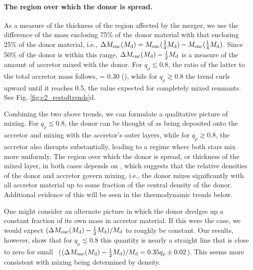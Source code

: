 \paragraph{The region over which the donor is spread.} As a measure of the thickness of the region affected by the merger, we use the difference of the mass enclosing 75\% of the donor material with that enclosing 25\% of the donor material, i.e., $\MMthick = M_{\rm enc}(\frac{3}{4}\Md) - M_{\rm enc}(\frac{1}{4}\Md)$.  Since 50\% of the donor is within this range, $\MMthick - \frac{1}{2}\Md$ is a measure of the amount of accretor mixed with the donor.  For $q_\rho\lesssim0.8$, the ratio of the latter to the total accretor mass follows,
\eqbegin
{} = 0.30\qrho
\qquad(),
\eqend
while for $q_\rho\gtrsim0.8$ the trend curls upward until it reaches 0.5, the value expected for completely mixed remnants.  See Fig. \ref{fig:c2_restoftrends}d.

Combining the two above trends, we can formulate a qualitative picture of mixing.  For $q_\rho\lesssim0.8$, the donor can be thought of as being deposited onto the accretor and mixing with the accretor's outer layers, while for $q_\rho\gtrsim0.8$, the accretor also disrupts substantially, leading to a regime where both stars mix more uniformly.  The region over which the donor is spread, or thickness of the mixed layer, in both cases depends on {\qrho}, which suggests that the relative densities of the donor and accretor govern mixing, i.e., the donor mixes significantly with all accretor material up to some fraction of the central density of the donor.  Additional evidence of this will be seen in the thermodynamic trends below.  

One might consider an alternate picture in which the donor dredges up a constant fraction of its own mass in accretor material.  If this were the case, we would expect $(\MMthick-\frac{1}{2}\Md)/\Md$ to roughly be constant.  Our results, however, show that for $q_\rho\lesssim0.8$ this quantity is nearly a straight line that is close to zero for small \qrho\ ($(\MMthick-\frac{1}{2}\Md)/\Md = 0.35\qrho\pm0.02$).  This seems more consistent with mixing being determined by density.


